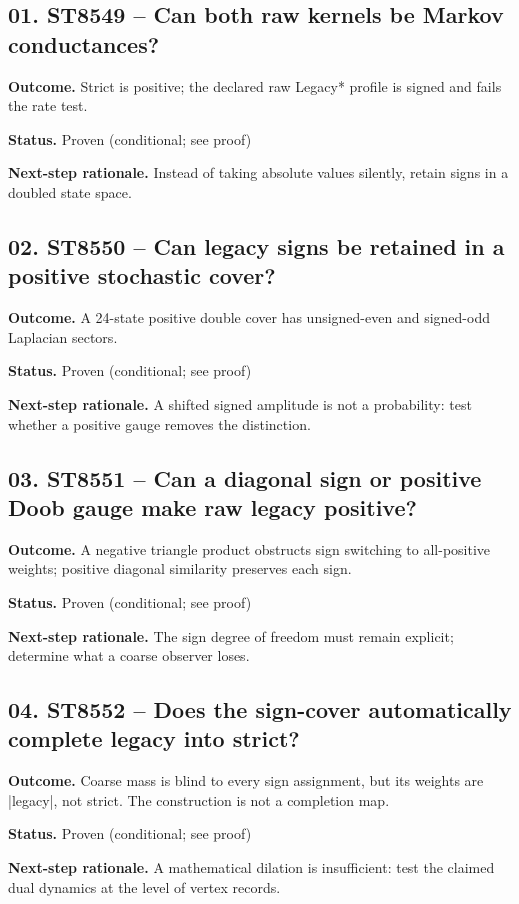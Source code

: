 \subsection*{01. ST8549 -- Can both raw kernels be Markov conductances?}
\noindent\textbf{Outcome.} Strict is positive; the declared raw Legacy* profile is signed and fails the rate test.\par
\noindent\textbf{Status.} Proven (conditional; see proof)\par
\noindent\textbf{Next-step rationale.} Instead of taking absolute values silently, retain signs in a doubled state space.\par\medskip
\subsection*{02. ST8550 -- Can legacy signs be retained in a positive stochastic cover?}
\noindent\textbf{Outcome.} A 24-state positive double cover has unsigned-even and signed-odd Laplacian sectors.\par
\noindent\textbf{Status.} Proven (conditional; see proof)\par
\noindent\textbf{Next-step rationale.} A shifted signed amplitude is not a probability: test whether a positive gauge removes the distinction.\par\medskip
\subsection*{03. ST8551 -- Can a diagonal sign or positive Doob gauge make raw legacy positive?}
\noindent\textbf{Outcome.} A negative triangle product obstructs sign switching to all-positive weights; positive diagonal similarity preserves each sign.\par
\noindent\textbf{Status.} Proven (conditional; see proof)\par
\noindent\textbf{Next-step rationale.} The sign degree of freedom must remain explicit; determine what a coarse observer loses.\par\medskip
\subsection*{04. ST8552 -- Does the sign-cover automatically complete legacy into strict?}
\noindent\textbf{Outcome.} Coarse mass is blind to every sign assignment, but its weights are |legacy|, not strict. The construction is not a completion map.\par
\noindent\textbf{Status.} Proven (conditional; see proof)\par
\noindent\textbf{Next-step rationale.} A mathematical dilation is insufficient: test the claimed dual dynamics at the level of vertex records.\par\medskip
